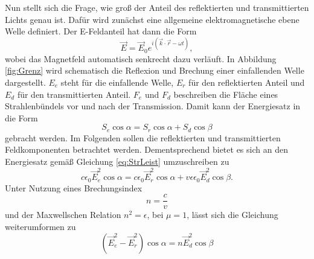 \noindent Nun stellt sich die Frage, wie groß der Anteil des reflektierten und transmittierten Lichts genau ist.
Dafür wird zunächst eine allgemeine elektromagnetische ebene Welle definiert.
Der E-Feldanteil hat dann die Form 
\begin{equation}
    \vec{E}=\vec{E}_0e^{i\left(\vec{k}\cdot\vec{r}-\omega t\right)},
    \label{eq:ebeneW}
\end{equation}
wobei das Magnetfeld automatisch senkrecht dazu verläuft. In Abbildung \ref{fig:Grenz} wird
schematisch die Reflexion und Brechung einer einfallenden Welle dargestellt. $E_e$ steht für die einfallende Welle,
$E_r$ für den reflektierten Anteil und $E_d$ für den transmittierten Anteil. $F_e$ und $F_d$ beschreiben die Fläche eines Strahlenbündels vor 
und nach der Transmission. Damit kann der Energiesatz in die Form
\begin{equation}   
    S_e\cos{\alpha}=S_r \cos{\alpha}+S_d\cos{\beta}
    \label{eq:Energie}
\end{equation}
gebracht werden.
Im Folgenden sollen die reflektierten und transmittierten Feldkomponenten betrachtet werden. Dementsprechend
bietet es sich an den Energiesatz gemäß Gleichung \eqref{eq:StrLeist} umzuschreiben zu
\begin{equation*}   
    c\epsilon_0\vec{E}_e^2\cos{\alpha}=c\epsilon_0\vec{E}_r^2\cos{\alpha}+v\epsilon\epsilon_0\vec{E}_d^2\cos{\beta}.
    \label{eq:Energie}
\end{equation*}
Unter Nutzung eines Brechungsindex
\begin{equation}
    n=\frac{c}{v}
    \label{eq:n}
\end{equation}
und der Maxwellschen Relation $n^2=\epsilon$, bei $\mu=1$, lässt sich die Gleichung weiterumformen zu
\begin{equation}
    \left(\vec{E}_e^2-\vec{E}_r^2\right)\cos{\alpha}=n\vec{E}_d^2\cos{\beta}
    \label{eq:Intensrelation}
\end{equation}

